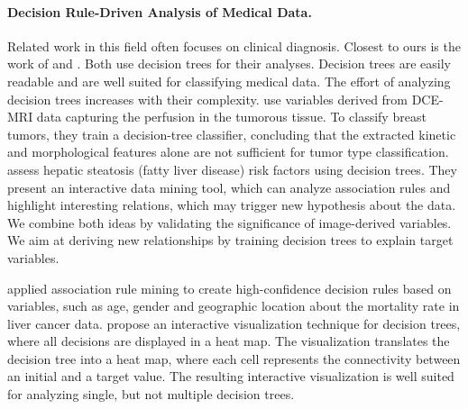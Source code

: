 \documentclass[a4paper,twoside]{style/article}
\begin{document}
\paragraph{Decision Rule-Driven Analysis of Medical Data.}
Related work in this field often focuses on clinical diagnosis.
Closest to ours is the work of \cite{Glasser2013} and \cite{Niemann2014}.
Both use decision trees for their analyses.
Decision trees are easily readable and are well suited for classifying medical data.
The effort of analyzing decision trees increases with their complexity.
\cite{Glasser2013} use variables derived from DCE-MRI data capturing the perfusion in the tumorous tissue.
To classify breast tumors, they train a decision-tree classifier, concluding that the extracted kinetic and morphological features alone are not sufficient for tumor type classification.
\cite{Niemann2014} assess hepatic steatosis (fatty liver disease) risk factors using decision trees.
They present an interactive data mining tool, which can analyze association rules and highlight interesting relations, which may trigger new hypothesis about the data.
We combine both ideas by validating the significance of image-derived variables.
We aim at deriving new relationships by training decision trees to explain target variables.

\cite{Pinheiro} applied association rule mining to create high-confidence decision rules based on variables, such as age, gender and geographic location about the mortality rate in liver cancer data.
\cite{Sekhavat} propose an interactive visualization technique for decision trees, where all decisions are displayed in a heat map.
The visualization translates the decision tree into a heat map, where each cell represents the connectivity between an initial and a target value.
The resulting interactive visualization is well suited for analyzing single, but not multiple decision trees.
\end{document}
